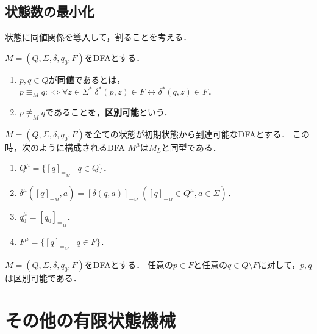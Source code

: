 \subsection{状態数の最小化}

\begin{screen}
    状態に同値関係を導入して，割ることを考える．
\end{screen}

\begin{definition}
    $M=(Q,\Sigma,\delta,q_0,F)$をDFAとする．
    \begin{enumerate}
        \item $p,q\in Q$が\textbf{同値}であるとは，$p\equiv_Mq:\Leftrightarrow \forall z\in\Sigma^*\;\delta^*(p,z)\in F\leftrightarrow \delta^*(q,z)\in F$．
        \item $p\not\equiv_Mq$であることを，\textbf{区別可能}という．
    \end{enumerate}
\end{definition}

\begin{theorem}
    $M=(Q,\Sigma,\delta,q_0,F)$を全ての状態が初期状態から到達可能なDFAとする．
    この時，次のように構成されるDFA $M^\mu$は$M_L$と同型である．
    \begin{enumerate}
        \item $Q^\mu=\{[q]_{\equiv_M}\mid q\in Q\}$．
        \item $\delta^\mu([q]_{\equiv_M},a)=[\delta(q,a)]_{\equiv_M}\;([q]_{\equiv_M}\in Q^\mu,a\in\Sigma)$．
        \item $q_0^\mu=[q_0]_{\equiv_M}$．
        \item $F^\mu=\{[q]_{\equiv_M}\mid q\in F\}$．
    \end{enumerate}
\end{theorem}

\begin{proposition}
    $M=(Q,\Sigma,\delta,q_0,F)$をDFAとする．
    任意の$p\in F$と任意の$q\in Q\setminus F$に対して，$p,q$は区別可能である．
\end{proposition}

\section{その他の有限状態機械}\label{sec-transducer}

